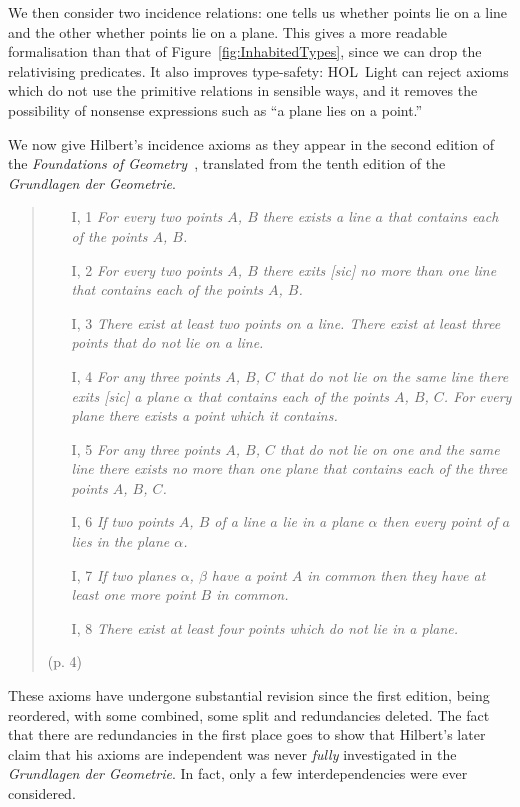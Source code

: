 We then consider two incidence relations: one tells us whether points lie on a line and the other whether points lie on a plane. This gives a more readable formalisation than that of Figure~\ref{fig:InhabitedTypes}, since we can drop the relativising predicates. It also improves type-safety: HOL~Light can reject axioms which do not use the primitive relations in sensible ways, and it removes the possibility of nonsense expressions such as ``a plane lies on a point.''

We now give Hilbert's incidence axioms as they appear in the second edition of the \emph{Foundations of Geometry}~\cite{FoundationsOfGeometry}, translated from the tenth edition of the \emph{Grundlagen der Geometrie}.
\begin{quotation}
\mbox{}\vspace{-\baselineskip}\begin{enumerate}
\item[I, 1] \emph{For every two points $A$, $B$ there exists a line $a$ that contains each of the points $A$, $B$.}
\item[I, 2] \emph{For every two points $A$, $B$ there exits [sic] no more than one line that contains each of the points $A$, $B$.}
\item[I, 3] \emph{There exist at least two points on a line. There exist at least three points that do not lie on a line.}
\item[I, 4] \emph{For any three points $A$, $B$, $C$ that do not lie on the same line there exits [sic] a plane $\alpha$ that contains each of the points $A$, $B$, $C$. For every plane there exists a point which it contains.}
\item[I, 5] \emph{For any three points $A$, $B$, $C$ that do not lie on one and the same line there exists no more than one plane that contains each of the three points $A$, $B$, $C$.}
\item[I, 6] \emph{If two points $A$, $B$ of a line $a$ lie in a plane $\alpha$ then every point of $a$ lies in the plane $\alpha$.}
\item[I, 7] \emph{If two planes $\alpha$, $\beta$ have a point $A$ in common then they have at least one more point $B$ in common.}
\item[I, 8] \emph{There exist at least four points which do not lie in a plane.}
\end{enumerate}
\flushright(p. 4)
\end{quotation}

These axioms have undergone substantial revision since the first edition, being reordered, with some combined, some split and redundancies deleted. The fact that there are redundancies in the first place goes to show that Hilbert's later claim that his axioms are independent was never \emph{fully} investigated in the \emph{Grundlagen der Geometrie}. In fact, only a few interdependencies were ever considered.

